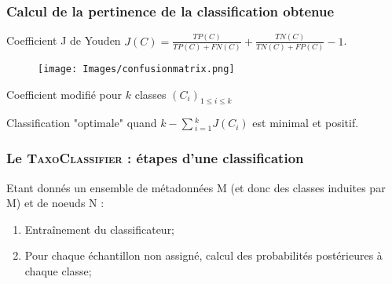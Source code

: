 \documentclass{beamer}
\begin{document}
\begin{frame}
\frametitle{Calcul de la pertinence de la classification obtenue}


\begin{block}{Coefficient J de Youden}
$J(C) = \frac{TP(C)}{TP(C) + FN(C)} + \frac{TN(C)}{TN(C) + FP(C)} - 1$.
\end{block}

\begin{figure}
\centering
\texttt{[image: Images/confusionmatrix.png]}
\end{figure}




\begin{block}{Coefficient \alert{modifié} pour $k$ classes $(C_{i})_{1 \le i \le k}$}
\begin{center}
Classification "optimale" quand $k - \sum{_{i = 1}^{k}}{J(C_{i})}$ est minimal et positif.
\end{center}
\end{block}

\end{frame}

\begin{frame}
\frametitle{Le \textsc{\bf TaxoClassifier} : étapes d'une classification}

Etant donnés un ensemble de métadonnées M (et donc des classes induites par M) et de noeuds N :
\bigskip
\begin{enumerate}
\item \alert{Entraînement} du classificateur;
\item Pour chaque échantillon non assigné, calcul des \alert{probabilités postérieures} à chaque classe;
\end{enumerate}
\end{frame}
\end{document}
